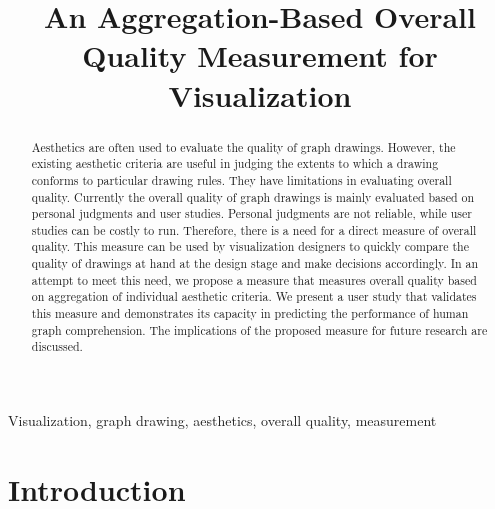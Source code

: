 \documentclass[conference,letterpaper]{IEEEtran}
\begin{document}
\title{An Aggregation-Based Overall Quality Measurement for Visualization}


\author{
}


\maketitle
\thispagestyle{plain}




\pagestyle{fancy}{
\fancyhf{}
\fancyfoot[R]{}}
\renewcommand{\headrulewidth}{0pt}
\renewcommand{\footrulewidth}{0pt}



\begin{abstract}
Aesthetics are often used to evaluate the quality of graph drawings. However, the existing aesthetic criteria are useful in judging the extents to which a drawing conforms to particular drawing rules. They have limitations in evaluating overall quality. Currently the overall quality of graph drawings is mainly evaluated based on personal judgments and user studies. Personal judgments are not reliable, while user studies can be costly to run. Therefore, there is a need for a direct measure of overall quality. This measure can be used by visualization designers to quickly compare the quality of drawings at hand at the design stage and make decisions accordingly. In an attempt to meet this need, we propose a measure that measures overall quality based on aggregation of individual aesthetic criteria. We present a user study that validates this measure and demonstrates its capacity in predicting the performance of human graph comprehension. The implications of the proposed measure for future research are discussed.
\end{abstract}


\begin{IEEEkeywords}
Visualization, graph drawing, aesthetics, overall quality, measurement
\end{IEEEkeywords}


\IEEEpeerreviewmaketitle


\section{Introduction} \label{sec:intro}
\end{document}
